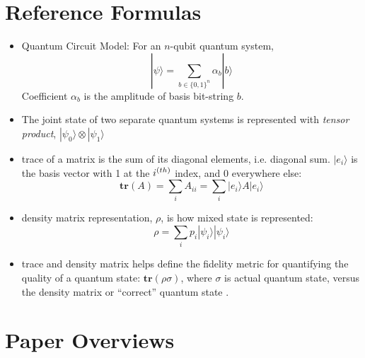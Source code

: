 \documentclass [12pt]{article}
\begin{document}
    \section{Reference Formulas} %
        \begin{itemize}
            \item Quantum Circuit Model: For an $n$-qubit quantum system,
            $$ | \psi \rangle = \sum_{b\in\{0,1\}^n} \alpha_b | b \rangle $$
            Coefficient $\alpha_b$ is the amplitude of basis bit-string $b$. 

            \item The joint state of two separate quantum systems is represented with \emph{tensor product}, $| \psi_0 \rangle \otimes | \psi_1 \rangle$
            
            \item trace of a matrix is the sum of its diagonal elements, i.e. diagonal sum. $|e_i\rangle$  is the basis vector with 1 at the $i^{\text(th)}$ index, and 0 everywhere else: $$ \textbf{tr}(A) = \sum_i A_{ii} = \sum_i | e_i \rangle A | e_i \rangle  $$
            
            \item density matrix representation, $\rho$, is how mixed state is represented: $$ \rho = \sum_i p_i | \psi_i \rangle | \psi_i \rangle $$
            
            \item trace and density matrix helps define the fidelity metric for quantifying the quality of a quantum state: $ \textbf{tr}(\rho \sigma)  $, where $\sigma$ is actual quantum state, versus the density matrix or ``correct'' quantum state \cite{resch21}.
        \end{itemize}


    \section{Paper Overviews} %
\end{document}
